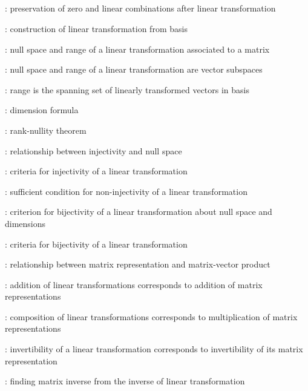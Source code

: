 \subsection*{}
\item {}: preservation of zero and linear combinations after linear transformation
\item {}: construction of linear transformation from basis
\item {}: null space and range of a linear transformation associated to a matrix
\item {}: null space and range of a linear transformation are vector subspaces
\item {}: range is the spanning set of linearly transformed vectors in basis
\item {}: dimension formula
\item {}: rank-nullity theorem
\item {}: relationship between injectivity and null space
\item {}: criteria for injectivity of a linear transformation
\item {}: sufficient condition for non-injectivity of a linear transformation
\item {}: criterion for bijectivity of a linear transformation about null space and dimensions
\item {}: criteria for bijectivity of a linear transformation
\item {}: relationship between matrix representation and matrix-vector product
\item {}: addition of linear transformations
corresponds to addition of matrix representations
\item {}: composition of linear transformations
corresponds to multiplication of matrix representations
\item {}: invertibility of a linear transformation
corresponds to invertibility of its matrix representation
\item {}: finding matrix inverse from the inverse of linear transformation
